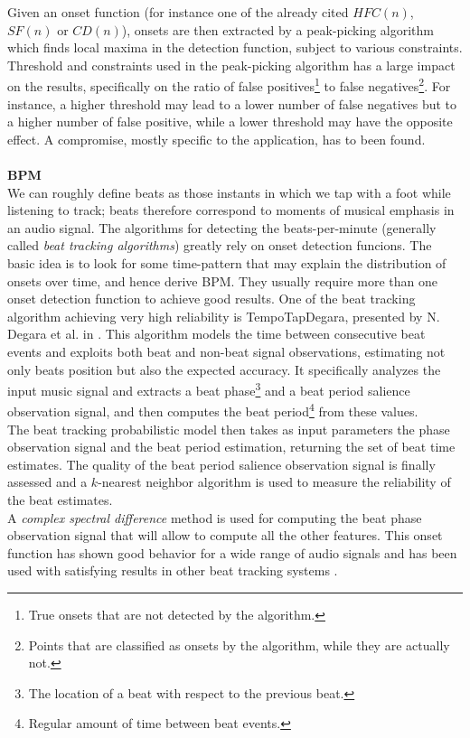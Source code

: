 Given an onset function (for instance one of the already cited $HFC(n)$, $SF(n)$ or $CD(n)$), onsets are then extracted by a peak-picking algorithm which finds local maxima in the detection function, subject to various constraints. Threshold and constraints used in the peak-picking algorithm has a large impact on the results, specifically on the ratio of false positives\footnote{True onsets that are not detected by the algorithm.} to false negatives\footnote{Points that are classified as onsets by the algorithm, while they are actually not.}. For instance, a higher threshold may lead to a lower number of false negatives but to a higher number of false positive, while a lower threshold may have the opposite effect. A compromise, mostly specific to the application, has to been found.
\\ \\ 
\textbf{BPM} \\ 
We can roughly define beats as those instants in which we tap with a foot while listening to track; beats therefore correspond to moments of musical emphasis in an audio signal. The algorithms for detecting the beats-per-minute (generally called \textit{beat tracking algorithms}) greatly rely on onset detection funcions. The basic idea is to look for some time-pattern that may explain the distribution of onsets over time, and hence derive BPM. They usually require more than one onset detection function to achieve good results. One of the beat tracking algorithm achieving very high reliability is TempoTapDegara, presented by N. Degara et al. in \cite{degara12}. This algorithm models the time between consecutive beat events and exploits both beat and non-beat signal observations, estimating not only beats position but also the expected accuracy. It specifically analyzes the input music signal and extracts a beat phase\footnote{The location of a beat with respect to the previous beat.} and a beat period salience observation signal, and then computes the beat period\footnote{Regular amount of time between beat events.} from these values.\\ The beat tracking probabilistic model then takes as input parameters the phase observation signal and the beat period estimation, returning the set of beat time estimates. The quality of the beat period salience observation signal is finally assessed and a $k$-nearest neighbor algorithm is used to measure the reliability of the beat estimates. \\
A \textit{complex spectral difference} method is used for computing the beat phase observation signal that will allow to compute all the other features. This onset function has shown good behavior for a wide range of audio signals and has been used with satisfying results in other beat tracking systems \cite{davies07}. 

